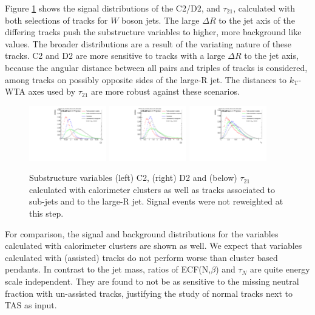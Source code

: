 Figure \ref{fig:selection} shows the signal distributions of the C2/D2, and $\tau_{21}$, calculated with both selections of tracks for $W$ boson jets. The large $\Delta R$ to the jet axis of the differing tracks push the substructure variables to higher, more background like values. The broader distributions are a result of the variating nature of these tracks. C2 and D2 are more sensitive to tracks with a large $\Delta R$ to the jet axis, because the angular distance between all pairs and triples of tracks is considered, among tracks on possibly opposite sides of the large-R jet. The distances to $k_\mathrm{T}$-WTA axes used by $\tau_{21}$ are more robust against these scenarios.
\begin{figure}
	\centering
	\includegraphics[width=0.3\textwidth]{sascha_input/plots/track_selection/h_ghost_sj_C2.pdf} 
	\includegraphics[width=0.3\textwidth]{sascha_input/plots/track_selection/h_ghost_sj_D2.pdf}
	\includegraphics[width=0.3\textwidth]{sascha_input/plots/track_selection/h_ghost_sj_nSub21.pdf}
\caption{\footnotesize{Substructure variables (left) C2, (right) D2 and (below) $\tau_{21}$ calculated with calorimeter clusters as well as tracks associated to sub-jets and to the large-R jet. Signal events were not reweighted at this step.}}\label{fig:selection}
\end{figure}
For comparison, the signal and background distributions for the variables calculated with calorimeter clusters are shown as well. We expect that variables calculated with (assisted) tracks do not perform worse than cluster based pendants. In contrast to the jet mass, ratios of ECF(N,$\beta$) and $\tau_N$ are quite energy scale independent. They are found to not be as sensitive to the missing neutral fraction with un-assisted tracks, justifying the study of normal tracks next to TAS as input. 